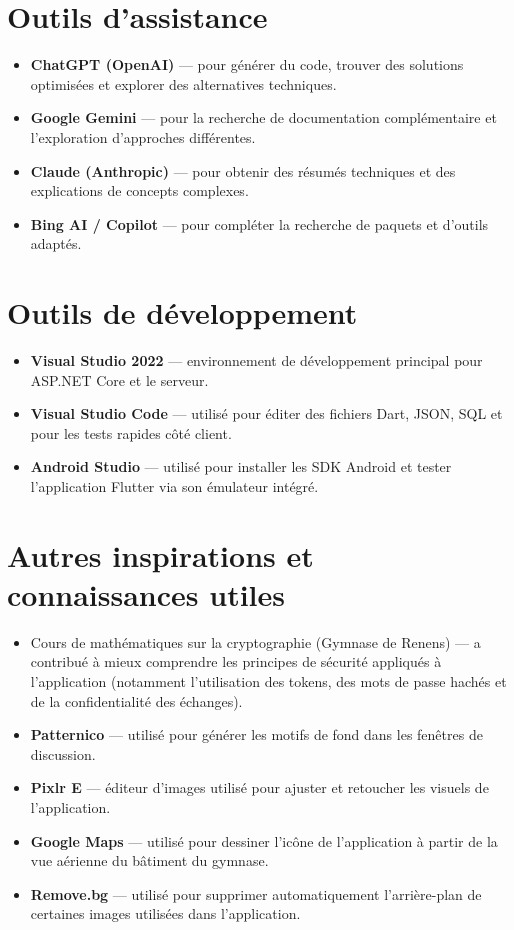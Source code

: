 \documentclass[12pt]{report}
\begin{document}
\section{Outils d’assistance}

\begin{itemize}
	\item \textbf{ChatGPT (OpenAI)} — pour générer du code, trouver des solutions optimisées et explorer des alternatives techniques.
	\item \textbf{Google Gemini} — pour la recherche de documentation complémentaire et l’exploration d’approches différentes.
	\item \textbf{Claude (Anthropic)} — pour obtenir des résumés techniques et des explications de concepts complexes.
	\item \textbf{Bing AI / Copilot} — pour compléter la recherche de paquets et d’outils adaptés.
\end{itemize}

\section{Outils de développement}

\begin{itemize}
	\item \textbf{Visual Studio 2022} — environnement de développement principal pour ASP.NET Core et le serveur.
	\item \textbf{Visual Studio Code} — utilisé pour éditer des fichiers Dart, JSON, SQL et pour les tests rapides côté client.
	\item \textbf{Android Studio} — utilisé pour installer les SDK Android et tester l’application Flutter via son émulateur intégré.
\end{itemize}

\section{Autres inspirations et connaissances utiles}

\begin{itemize}
	\item Cours de mathématiques sur la cryptographie (Gymnase de Renens) — a contribué à mieux comprendre les principes de sécurité appliqués à l’application (notamment l’utilisation des tokens, des mots de passe hachés et de la confidentialité des échanges).
	\item \textbf{Patternico} — utilisé pour générer les motifs de fond dans les fenêtres de discussion.
	\item \textbf{Pixlr E} — éditeur d’images utilisé pour ajuster et retoucher les visuels de l’application.
	\item \textbf{Google Maps} — utilisé pour dessiner l’icône de l’application à partir de la vue aérienne du bâtiment du gymnase.
	\item \textbf{Remove.bg} — utilisé pour supprimer automatiquement l’arrière-plan de certaines images utilisées dans l’application.
\end{itemize}
\end{document}
